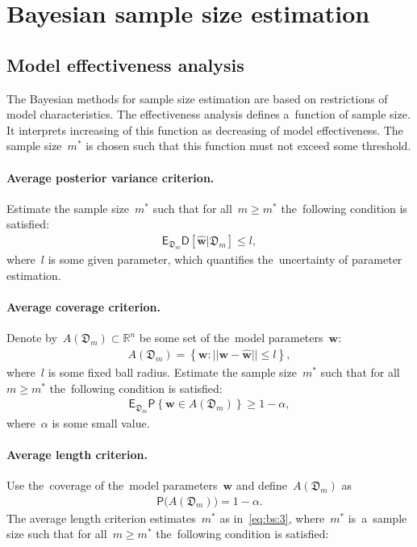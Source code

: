 \documentclass[
11pt,%
tightenlines,%
twoside,%
onecolumn,%
nofloats,%
nobibnotes,%
nofootinbib,%
superscriptaddress,%
noshowpacs,%
centertags]%
{revtex4}
\begin{document}
\section{Bayesian sample size estimation}
\subsection{Model effectiveness analysis}
The Bayesian methods for sample size estimation are based on
restrictions of model  characteristics. The effectiveness analysis
defines a~function of sample size. It interprets increasing of this
function as decreasing of model effectiveness. The sample size~$m^*$
is chosen such that this function must not exceed some threshold.

\paragraph{Average posterior variance criterion.}
Estimate the sample size~$m^*$ such that for all~$m \geq m^*$ the~following condition is satisfied:
\[
\label{eq:bs:1}
\begin{aligned}
    \mathsf{E}_{\mathfrak{D}_m}\mathsf{D}\left[\hat{\mathbf{w}}|\mathfrak{D}_m\right] \leq l,
\end{aligned}
\]
where~$l$ is some given parameter, which quantifies the~uncertainty of parameter estimation.

\paragraph{Average coverage criterion.}
Denote by~$A\left(\mathfrak{D}_{m}\right) \subset \mathbb{R}^n$ be some set of the~model parameters~$\mathbf{w}$:
\[
\label{eq:bs:2}
\begin{aligned}
    A\left(\mathfrak{D}_{m}\right) = \left\{\mathbf{w}:||\mathbf{w} - \hat{\mathbf{w}}||\leq l\right\},
\end{aligned}
\]
where~$l$ is some fixed ball radius. Estimate the sample size~$m^*$ such that for all~$m \geq m^*$ the~following condition is satisfied:
\[
\label{eq:bs:3}
\begin{aligned}
    \mathsf{E}_{\mathfrak{D}_m}\mathsf{P}\left\{\mathbf{w} \in A\left(\mathfrak{D}_m\right)\right\} \geq 1-\alpha,
\end{aligned}
\]
where~$\alpha$ is some small value.

\paragraph{Average length criterion.}
Use the~coverage of the~model parameters~$\mathbf{w}$ and define~$A\left(\mathfrak{D}_{m}\right)$ as
\[
\label{eq:bs:4}
\begin{aligned}
    \mathsf{P}\bigl(A\left(\mathfrak{D}_{m}\right)\bigr) = 1- \alpha.
\end{aligned}
\]
The average length criterion estimates~$m^*$ as in~\eqref{eq:bs:3},
where~$m^*$ is~a~sample size such that for all~$m \geq m^*$
the~following condition is satisfied:
\end{document}
